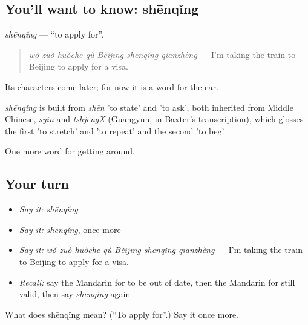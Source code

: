 \subsection*{You'll want to know: shēnqǐng}
\emph{shēnqǐng} — \textquotedblleft{}to apply for\textquotedblright{}.

\begin{quote}
\emph{wǒ zuò huǒchē qù Běijīng shēnqǐng qiānzhèng} — I'm taking the train to Beijing to apply for a visa.
\end{quote}

Its characters come later; for now it is a word for the ear.

\begin{cousinweb}
\emph{shēnqǐng} is built from \emph{shēn} 'to state' and  'to ask', both inherited from Middle Chinese, \emph{syin} and \emph{tshjengX} (Guangyun, in Baxter's transcription), which glosses the first 'to stretch' and 'to repeat' and the second 'to beg'.
\end{cousinweb}

\begin{grammarlens}[title={What you've built}]
One more word for getting around.
\end{grammarlens}

\subsection*{Your turn}
\begin{itemize}
\raggedright
  \item \emph{Say it:} \emph{shēnqǐng}
  \item \emph{Say it:} \emph{shēnqǐng}, once more
  \item \emph{Say it:} \emph{wǒ zuò huǒchē qù Běijīng shēnqǐng qiānzhèng} — I'm taking the train to Beijing to apply for a visa.
  \item \emph{Recall:} say the Mandarin for to be out of date, then the Mandarin for still valid, then say \emph{shēnqǐng} again
\end{itemize}

\begin{tcolorbox}[breakable,colback=teal!4,colframe=teal!35!black,title={Before you move on}]
What does shēnqǐng mean? (\textquotedblleft{}To apply for\textquotedblright{}.) Say it once more.
\end{tcolorbox}
